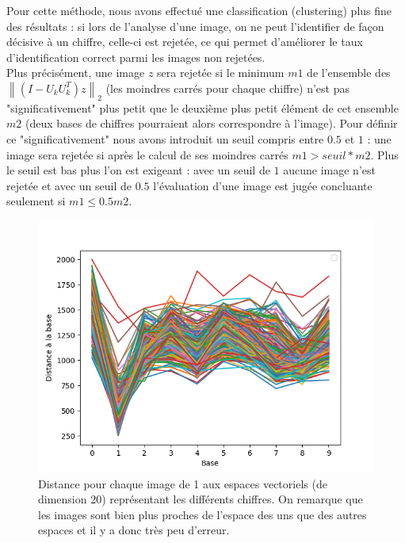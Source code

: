 \documentclass[a4paper,11pt,twoside]{report}
\newcommand{\norm}[1]{\left\lVert#1\right\rVert} %
\begin{document}
Pour cette méthode, nous avons effectué une classification (clustering) plus fine des résultats : si lors de l'analyse d'une image, on ne peut l'identifier de façon décisive à un chiffre, celle-ci est rejetée, ce qui permet d'améliorer le taux d'identification correct parmi les images non rejetées. \\
Plus précisément, une image $z$ sera rejetée si le minimum $m1$ de l'ensemble des $ \norm{(I-U_{k}U_{k}^{T})z}_{2}$ (les moindres carrés pour chaque chiffre) n'est pas "significativement" plus petit que le deuxième plus petit élément de cet ensemble $m2$ (deux bases de chiffres pourraient alors correspondre à l'image). Pour définir ce "significativement" nous avons introduit un seuil compris entre $0.5$ et $1$ : une image sera rejetée si après le calcul de ses moindres carrés $m1>seuil*m2$. Plus le seuil est bas plus l'on est exigeant : avec un seuil de $1$ aucune image n'est rejetée et avec un seuil de $0.5$ l'évaluation d'une image est jugée concluante seulement si $m1\leq 0.5m2$.


\begin{figure}[H]
\begin{center}
  	\includegraphics[width=0.7\linewidth]{Graphs/Distance_bases_20_1.png}
  	\caption{Distance pour chaque image de 1 aux espaces vectoriels (de dimension 20) représentant les différents chiffres. On remarque que les images sont bien plus proches de l'espace des uns que des autres espaces et il y a donc très peu d'erreur.}
  	\end{center}
\end{figure}
\end{document}
